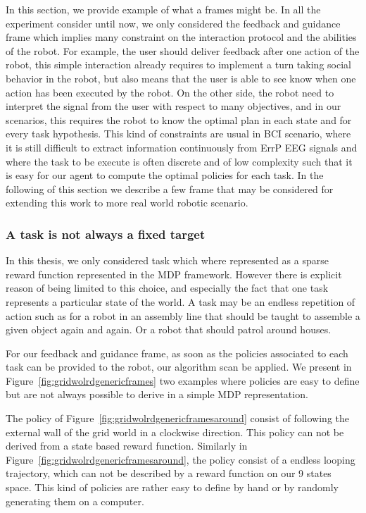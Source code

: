 In this section, we provide example of what a frames might be. In all the experiment consider until now, we only considered the feedback and guidance frame which implies many constraint on the interaction protocol and the abilities of the robot. For example, the user should deliver feedback after one action of the robot, this simple interaction already requires to implement a turn taking social behavior in the robot, but also means that the user is able to see know when one action has been executed by the robot. On the other side, the robot need to interpret the signal from the user with respect to many objectives, and in our scenarios, this requires the robot to know the optimal plan in each state and for every task hypothesis. This kind of constraints are usual in BCI scenario, where it is still difficult to extract information continuously from ErrP EEG signals and where the task to be execute is often discrete and of low complexity such that it is easy for our agent to compute the optimal policies for each task. In the following of this section we describe a few frame that may be considered for extending this work to more real world robotic scenario.

\subsubsection*{A task is not always a fixed target}

In this thesis, we only considered task which where represented as a sparse reward function represented in the MDP framework. However there is explicit reason of being limited to this choice, and especially the fact that one task represents a particular state of the world. A task may be an endless repetition of action such as for a robot in an assembly line that should be taught to assemble a given object again and again. Or a robot that should patrol around houses. 

For our feedback and guidance frame, as soon as the policies associated to each task can be provided to the robot, our algorithm scan be applied. We present in Figure~\ref{fig:gridwolrdgenericframes} two examples where policies are easy to define but are not always possible to derive in a simple MDP representation.

The policy of Figure~\ref{fig:gridwolrdgenericframesaround} consist of following the external wall of the grid world in a clockwise direction. This policy can not be derived from a state based reward function. Similarly in Figure~\ref{fig:gridwolrdgenericframesaround}, the policy consist of a endless looping trajectory, which can not be described by a reward function on our 9 states space. This kind of policies are rather easy to define by hand or by randomly generating them on a computer. 


